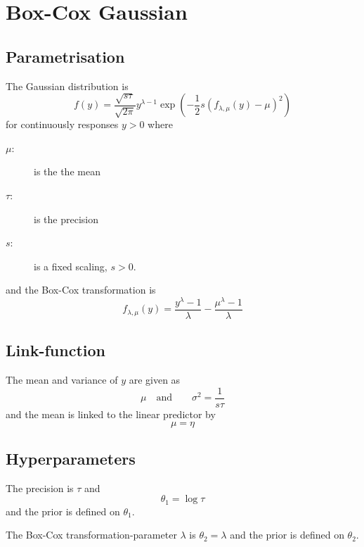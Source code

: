 \documentclass[a4paper,11pt]{article}
\begin{document}
\section*{Box-Cox Gaussian}

\subsection*{Parametrisation}

The Gaussian distribution is
\begin{displaymath}
    f(y) = \frac{\sqrt{s\tau}}{\sqrt{2\pi}} y^{\lambda-1} \exp\left( -\frac{1}{2}
      s\left(f_{\lambda,\mu}(y)-\mu\right)^{2}\right) 
\end{displaymath}
for continuously responses $y>0$ where
\begin{description}
\item[$\mu$:] is the the mean
\item[$\tau$:] is the precision
\item[$s$:] is a fixed scaling, $s>0$.
\end{description}
and the Box-Cox transformation is
\begin{displaymath}
    f_{\lambda,\mu}(y) = \frac{y^{\lambda}-1}{\lambda} - \frac{\mu^{\lambda} -1}{\lambda}
\end{displaymath}


\subsection*{Link-function}

The mean and variance of $y$ are given as
\begin{displaymath}
    \mu \quad\text{and}\qquad \sigma^{2} = \frac{1}{s\tau}
\end{displaymath}
and the mean is linked to the linear predictor by
\begin{displaymath}
    \mu = \eta
\end{displaymath}

\subsection*{Hyperparameters}

The precision is $\tau$ and 
\begin{displaymath}
    \theta_1 = \log \tau
\end{displaymath}
and the prior is defined on $\theta_1$.

The Box-Cox transformation-parameter $\lambda$ is 
$\theta_2 = \lambda$
and the prior is defined on $\theta_2$.
\end{document}
